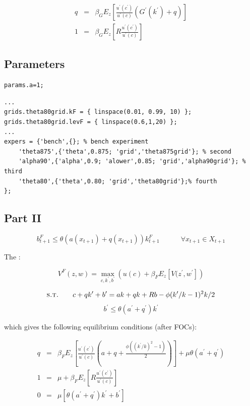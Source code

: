 \documentclass{article}
\begin{document}
\begin{eqnarray*}
 q & = & \beta_G E_z\left[ \frac{u^\prime(c^\prime)}{u^\prime(c)}\left(G^\prime(k^\prime)+q\right)\right]\\
 1 & = & \beta_G E_z\left[R\frac{u^\prime(c^\prime)}{u^\prime(c)}\right]
\end{eqnarray*}


\subsection*{Parameters}


\begin{verbatim}
params.a=1;

\end{verbatim}



\color{lightgray} \begin{verbatim} 
...
grids.theta80grid.kF = { linspace(0.01, 0.99, 10) };
grids.theta80grid.levF = { linspace(0.6,1,20) };
...
expers = {'bench',{}; % bench experiment
    'theta875',{'theta',0.875; 'grid','theta875grid'}; % second
    'alpha90',{'alpha',0.9; 'alower',0.85; 'grid','alpha90grid'}; % third
    'theta80',{'theta',0.80; 'grid','theta80grid'};% fourth
};

\end{verbatim} \color{black}




\subsection*{Part II}

$$b_{t+1}^F \leq \theta \left( a(x_{t+1}) + q(x_{t+1}) \right)k_{t+1}^F  \quad \quad \quad \forall x_{t+1} \in X_{t+1} $$


The :

$$ V^F(z,w) = \max_{c,k^{\prime},b^{\prime} } \left( u(c) + \beta_F E_z \left[ V(z^{\prime},w^{\prime} \right]  \right) $$

$$ \textsc{s.t.} \quad \quad c+qk^\prime+b^\prime = ak + qk +Rb - \phi(k^\prime/k - 1)^2k/2$$
$$b^\prime \leq \theta \left( a^\prime + q^\prime \right)k^\prime $$

which gives the following equilibrium conditions (after FOCs):

\begin{eqnarray*}
 q & = & \beta_F E_z\left[ \frac{u^\prime(c^\prime)}{u^\prime(c)}(a+q+\frac{\phi((k^\prime/k)^2 -1)}{2})\right]+\mu \theta (a^\prime + q^\prime)\\
 1 & = & \mu + \beta_F E_z\left[R\frac{u^\prime(c^\prime)}{u^\prime(c)}\right] \\
 0 & = & \mu \left[\theta (a^\prime + q^\prime) k^\prime + b^\prime\right] 
\end{eqnarray*}
\end{document}
